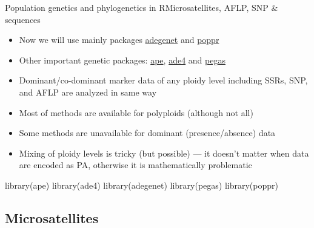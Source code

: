 \documentclass[compress, ucs, xelatex, 11pt, xcolor=svgnames,
	hyperref={
		bookmarks=true,
		unicode=true,
		colorlinks=true,
		pdftitle={Molecular data in R},
		plainpages=false,
		pdfauthor={Vojtech Zeisek},
		pdfsubject={Course about phylogeny and evolution in R},
		pdfcreator={XeLaTeX},
		pdfkeywords={R, evolution, phylogeny, molecular data},
		linkcolor=Tomato,
		anchorcolor=SaddleBrown,
		citecolor=Goldenrod,
		filecolor=DarkMagenta,
		menucolor=Sienna,
		urlcolor=DarkTurquoise,
		pdftex},
	url={hyphens, lowtilde} %
	]{beamer}
\begin{document}
\begin{frame}[fragile]{Population genetics and phylogenetics in R}{Microsatellites, AFLP, SNP \& sequences}
	\begin{multicols}{2}
		\begin{itemize}
			\item Now we will use mainly packages \href{http://adegenet.r-forge.r-project.org/}{adegenet} and \href{http://grunwaldlab.cgrb.oregonstate.edu/poppr-r-package-population-genetics}{poppr}
			\item Other important genetic packages: \href{http://ape-package.ird.fr/}{ape}, \href{http://pbil.univ-lyon1.fr/ADE-4/}{ade4} and \href{http://ape-package.ird.fr/pegas.html}{pegas}
			\item Dominant/co-dominant marker data of any ploidy level including SSRs, SNP, and AFLP are analyzed in same way
			\item Most of methods are available for polyploids (although not all)
			\item Some methods are unavailable for dominant (presence/absence) data
			\item Mixing of ploidy levels is tricky (but possible) --- it doesn't matter when data are encoded as PA, otherwise it is mathematically problematic
		\end{itemize}
		\begin{spluscode}
    library(ape)
    library(ade4)
    library(adegenet)
    library(pegas)
    library(poppr)
		\end{spluscode}
	\end{multicols}
\end{frame}

\subsection{Microsatellites}
\end{document}
